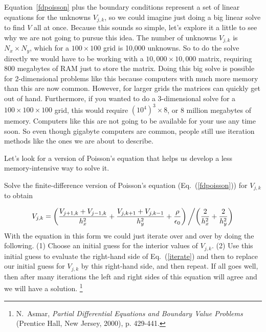 Equation~\eqref{fdpoisson} plus the boundary conditions represent a
set of linear equations for the unknowns $V_{j,k}$, so we could
imagine just doing a big linear solve to find $V$ all at once.
Because this sounds so simple, let's explore it a little to see why
we are not going to pursue this idea. The number of unknowns
$V_{j,k}$ is $N_x \times N_y$, which for a $100 \times 100$ grid is
10,000 unknowns. So to do the solve directly we would have to be
working with a $10,000 \times 10,000$ matrix, requiring 800 megabytes
of RAM just to store the matrix. Doing this big solve is possible for
2-dimensional problems like this because computers with much more
memory than this are now common. However, for larger grids the
matrices can quickly get out of hand. Furthermore, if you wanted to
do a 3-dimensional solve for a $100 \times 100 \times 100$ grid, this
would require $(10^4)^3\times 8$, or 8 million megabytes of memory.
Computers like this are not going to be available for your use any
time soon. So even though gigabyte computers are common, people still
use iteration methods like the ones we are about to describe.


Let's look for a version of Poisson's equation that helps us
develop a less memory-intensive way to solve it.
\begin{enumerate}
\probtwo \label{P:19.1} Solve the finite-difference version of Poisson's
equation (Eq.~(\ref{fdpoisson})) for $V_{j,k}$ to obtain
\end{enumerate}
 \begin{equation}
    V_{j,k}= \left(
    {V_{j+1,k}+V_{j-1,k} \over h_x^2} +
    {V_{j,k+1}+V_{j,k-1} \over h_y^2} +
    {\rho \over \epsilon_0} \right) \left/ \left(
    {2 \over h_x^2} + {2 \over h_y^2} \right) \right.
    \label{iterate}
\end{equation}
With the equation in this form we could just iterate over and
over by doing the following.  (1) Choose an
initial guess for the interior values of $V_{j,k}$. (2) Use
this initial guess to evaluate the right-hand side of
Eq.~(\ref{iterate}) and then to replace our initial guess for
$V_{j,k}$ by this right-hand side, and then repeat. If all goes
well, then after many iterations the left and right sides of
this equation will agree and we will have a solution.
\footnote{N.\ Asmar, {\it Partial Differential Equations and
Boundary Value Problems} (Prentice Hall, New Jersey, 2000), p.
429-441.}


